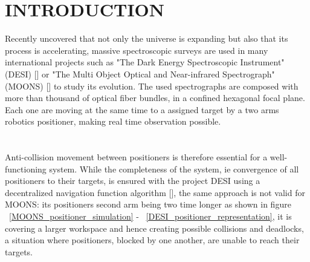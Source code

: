 \documentclass[]{spie}  %
\begin{document}
	
	\section{INTRODUCTION}
	\label{INTRODUCTION}
	Recently uncovered that not only the universe is expanding but also that its process is accelerating, massive spectroscopic surveys are used in many international projects such as  "The Dark Energy Spectroscopic Instrument" (DESI) [] or  "The Multi Object Optical and Near-infrared Spectrograph" (MOONS) [] to study its evolution. The used spectrographs are composed with more than thousand of optical fiber bundles, in a confined hexagonal focal plane. Each one are moving at the same time to a assigned target by a two arms robotics positioner, making real time observation possible.\\\\\\
	Anti-collision movement between positioners is therefore essential for a well-functioning system. While the completeness of the system, ie convergence of all positioners to their targets, is ensured with the project DESI using a decentralized navigation function algorithm  [], the same approach is not valid for MOONS: its positioners second arm being two time longer as shown in figure ~\ref{MOONS_positioner_simulation} - ~\ref{DESI_positioner_representation}, it is covering a larger workspace and hence creating possible collisions and deadlocks, a situation where positioners, blocked by one another, are unable to reach their targets.\\
	
\end{document}
